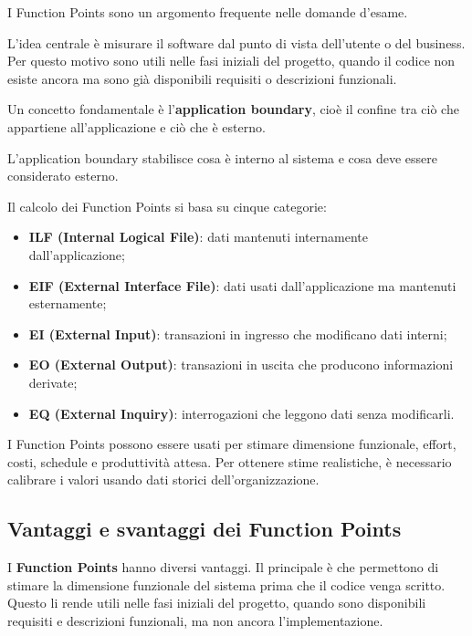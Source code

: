 \begin{notaesame}
I Function Points sono un argomento frequente nelle domande d'esame.
\end{notaesame}

L'idea centrale è misurare il software dal punto di vista dell'utente o del business. Per questo motivo sono utili nelle fasi iniziali del progetto, quando il codice non esiste ancora ma sono già disponibili requisiti o descrizioni funzionali.

Un concetto fondamentale è l'\textbf{application boundary}, cioè il confine tra ciò che appartiene all'applicazione e ciò che è esterno.

\begin{notaslide}
L'application boundary stabilisce cosa è interno al sistema e cosa deve essere considerato esterno.
\end{notaslide}

Il calcolo dei Function Points si basa su cinque categorie:

\begin{itemize}
    \item \textbf{ILF (Internal Logical File)}: dati mantenuti internamente dall'applicazione;
    \item \textbf{EIF (External Interface File)}: dati usati dall'applicazione ma mantenuti esternamente;
    \item \textbf{EI (External Input)}: transazioni in ingresso che modificano dati interni;
    \item \textbf{EO (External Output)}: transazioni in uscita che producono informazioni derivate;
    \item \textbf{EQ (External Inquiry)}: interrogazioni che leggono dati senza modificarli.
\end{itemize}

I Function Points possono essere usati per stimare dimensione funzionale, effort, costi, schedule e produttività attesa. Per ottenere stime realistiche, è necessario calibrare i valori usando dati storici dell'organizzazione.

\subsection{Vantaggi e svantaggi dei Function Points}

I \textbf{Function Points} hanno diversi vantaggi. Il principale è che permettono di stimare la dimensione funzionale del sistema prima che il codice venga scritto. Questo li rende utili nelle fasi iniziali del progetto, quando sono disponibili requisiti e descrizioni funzionali, ma non ancora l'implementazione.

